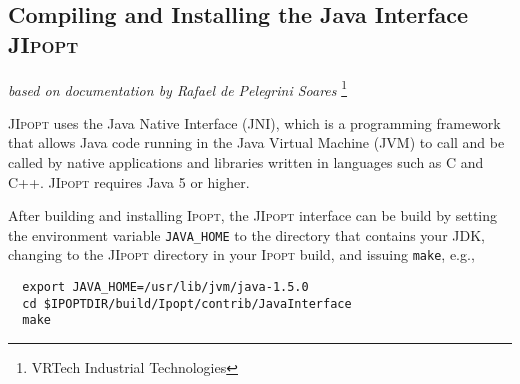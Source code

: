 \documentclass[10pt]{article}
\newcommand{\Ipopt}{\textsc{Ipopt}\xspace}
\newcommand{\JIpopt}{\textsc{JIpopt}\xspace}
\begin{document}





\subsection{Compiling and Installing the Java Interface \JIpopt}  \label{sec.jipopt.build}
\hfill \textit{based on documentation by Rafael de Pelegrini Soares}%
\footnote{VRTech Industrial Technologies}
\medskip

\JIpopt uses the Java Native Interface (JNI), which is a programming framework 
that allows Java code running in the Java Virtual Machine (JVM) to call and be 
called by native applications and libraries written in languages such as C and 
C++.
\JIpopt requires Java 5 or higher.

After building and installing \Ipopt, the \JIpopt interface can be build by 
setting the environment variable {\tt JAVA\_HOME} to the directory that 
contains your JDK, changing to the \JIpopt directory in your \Ipopt build, and 
issuing {\tt make}, e.g.,
\begin{verbatim}
  export JAVA_HOME=/usr/lib/jvm/java-1.5.0
  cd $IPOPTDIR/build/Ipopt/contrib/JavaInterface
  make
\end{verbatim}
\end{document}
